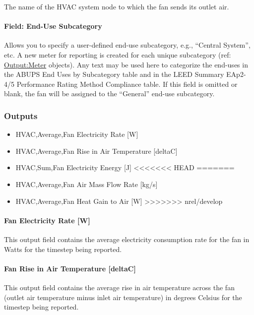 The name of the HVAC system node to which the fan sends its outlet air.

\paragraph{Field: End-Use Subcategory}\label{field-end-use-subcategory-001}

Allows you to specify a user-defined end-use subcategory, e.g., ``Central System'', etc. A new meter for reporting is created for each unique subcategory (ref: \hyperref[outputmeter-and-outputmetermeterfileonly]{Output:Meter} objects). Any text may be used here to categorize the end-uses in the ABUPS End Uses by Subcategory table and in the LEED Summary EAp2-4/5 Performance Rating Method Compliance table. If this field is omitted or blank, the fan will be assigned to the ``General'' end-use subcategory.

\subsubsection{Outputs}\label{outputs-013}

\begin{itemize}
\item
  HVAC,Average,Fan Electricity Rate {[}W{]}
\item
  HVAC,Average,Fan Rise in Air Temperature {[}deltaC{]}
\item
  HVAC,Sum,Fan Electricity Energy {[}J{]}
<<<<<<< HEAD
=======
\item
  HVAC,Average,Fan Air Mass Flow Rate {[}kg/s{]}
\item
  HVAC,Average,Fan Heat Gain to Air {[}W{]}
>>>>>>> nrel/develop
\end{itemize}

\paragraph{Fan Electricity Rate {[}W{]}}\label{fan-electric-power-w}

This output field contains the average electricity consumption rate for the fan in Watts for the timestep being reported.

\paragraph{Fan Rise in Air Temperature {[}deltaC{]}}\label{fan-rise-in-air-temperature-deltac}

This output field contains the average rise in air temperature across the fan (outlet air temperature minus inlet air temperature) in degrees Celsius for the timestep being reported.

